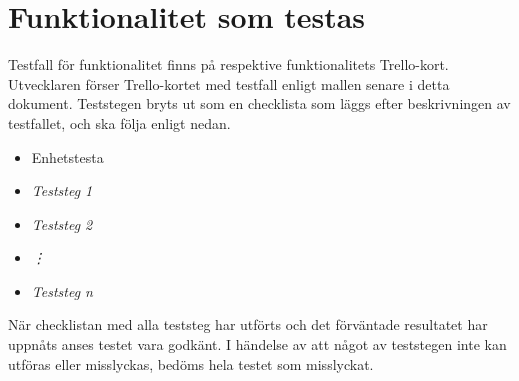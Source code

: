 \section{Funktionalitet som testas}
Testfall för funktionalitet finns på respektive funktionalitets Trello-kort. Utvecklaren förser Trello-kortet med testfall enligt mallen senare i detta dokument. Teststegen bryts ut som en checklista som läggs efter beskrivningen av testfallet, och ska följa enligt nedan.

\begin{itemize}
\item Enhetstesta
\item \textit{Teststeg 1}
\item \textit{Teststeg 2}
\item \textit{\vdots}
\item \textit{Teststeg n}
\end{itemize}

När checklistan med alla teststeg har utförts och det förväntade resultatet har uppnåts anses testet vara godkänt. I händelse av att något av teststegen inte kan utföras eller misslyckas, bedöms hela testet som misslyckat.
